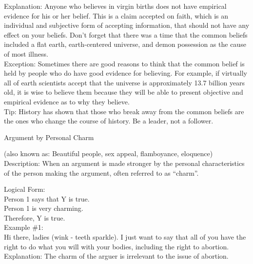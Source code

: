 \documentclass[a4paper,12pt,single,pdftex]{scrartcl}
\begin{document}
{    
      Explanation: Anyone who believes in virgin births does not have empirical evidence for his or her belief.  This is a claim accepted on faith, which is an individual and subjective form of accepting information, that should not have any effect on your beliefs.  Don’t forget that there was a time that the common beliefs included a flat earth, earth-centered universe, and demon possession as the cause of most illness.
    \\

    
      Exception: Sometimes there are good reasons to think that the common belief is held by people who do have good evidence for believing.  For example, if virtually all of earth scientists accept that the universe is approximately 13.7 billion years old, it is wise to believe them because they will be able to present objective and empirical evidence as to why they believe.
    \\

    
      Tip: History has shown that those who break away from the common beliefs are the ones who change the course of history.  Be a leader, not a follower.
    \\

  }


Argument by Personal Charm
    
      (also known as: Beautiful people, sex appeal, flamboyance, eloquence)
    \\

  
    Description: When an argument is made stronger by the personal characteristics of the person making the argument, often referred to as “charm”.

    
      Logical Form:
    \\

    
      Person 1 says that Y is true.
    \\

    
      Person 1 is very charming.
    \\

    
      Therefore, Y is true.
    \\

    
      Example \#1:
    \\

    
      Hi there, ladies (wink - teeth sparkle). I just want to say that all of you have the right to do what you will with your bodies, including the right to abortion.
    \\

    
      Explanation: The charm of the arguer is irrelevant to the issue of abortion.
    \\
\end{document}
